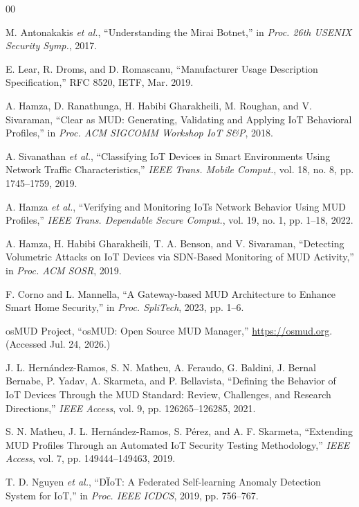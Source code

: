 \documentclass[journal]{IEEEtran}
\theoremstyle{definition}
\begin{document}
\begin{thebibliography}{00}

 M. Antonakakis \emph{et al.}, ``Understanding the Mirai Botnet,'' in
\emph{Proc. 26th USENIX Security Symp.}, 2017.

 E. Lear, R. Droms, and D. Romascanu, ``Manufacturer Usage Description
Specification,'' RFC 8520, IETF, Mar. 2019.

 A. Hamza, D. Ranathunga, H. Habibi Gharakheili, M. Roughan, and
V. Sivaraman, ``Clear as MUD: Generating, Validating and Applying IoT Behavioral
Profiles,'' in \emph{Proc. ACM SIGCOMM Workshop IoT S\&P}, 2018.

 A. Sivanathan \emph{et al.}, ``Classifying IoT Devices
in Smart Environments Using Network Traffic Characteristics,'' \emph{IEEE Trans. Mobile
Comput.}, vol. 18, no. 8, pp. 1745--1759, 2019.

 A. Hamza \emph{et al.}, ``Verifying and Monitoring IoTs Network
Behavior Using MUD Profiles,'' \emph{IEEE Trans. Dependable Secure Comput.}, vol. 19, no.
1, pp. 1--18, 2022.

 A. Hamza, H. Habibi Gharakheili, T. A. Benson, and V. Sivaraman,
``Detecting Volumetric Attacks on IoT Devices via SDN-Based Monitoring of MUD Activity,''
in \emph{Proc. ACM SOSR}, 2019.

 F. Corno and L. Mannella, ``A Gateway-based MUD
Architecture to Enhance Smart Home Security,'' in \emph{Proc. SpliTech}, 2023, pp. 1--6.

 osMUD Project, ``osMUD: Open Source MUD Manager,''
\url{https://osmud.org}. (Accessed Jul. 24, 2026.)

 J. L. Hern\'andez-Ramos, S. N. Matheu,
A. Feraudo, G. Baldini, J. Bernal Bernabe, P. Yadav, A. Skarmeta, and
P. Bellavista, ``Defining the Behavior of IoT Devices Through the MUD Standard:
Review, Challenges, and Research Directions,'' \emph{IEEE Access}, vol. 9,
pp. 126265--126285, 2021.

 S. N. Matheu, J. L. Hern\'andez-Ramos, S. P\'erez,
and A. F. Skarmeta, ``Extending MUD Profiles Through an Automated IoT Security
Testing Methodology,'' \emph{IEEE Access}, vol. 7, pp. 149444--149463, 2019.

 T. D. Nguyen \emph{et al.}, ``D\"IoT: A Federated Self-learning Anomaly
Detection System for IoT,'' in \emph{Proc. IEEE ICDCS}, 2019, pp. 756--767.


\end{thebibliography}
\end{document}
